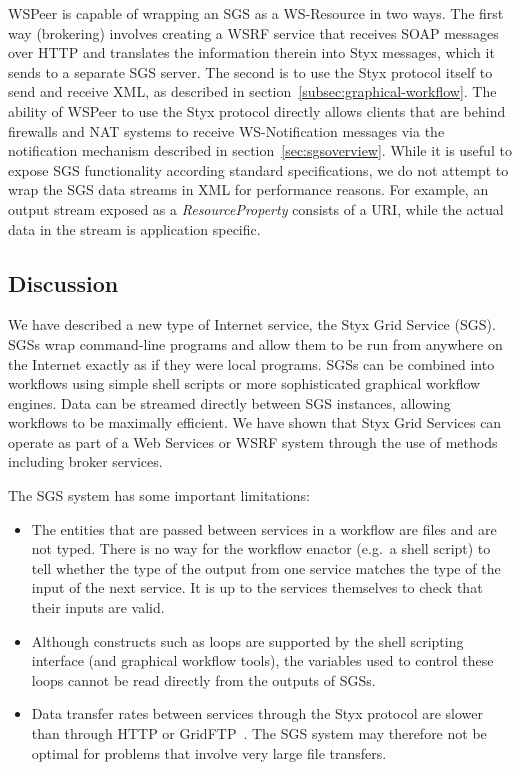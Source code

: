 \documentclass[a4paper]{article}
\begin{document}
WSPeer is capable of wrapping an SGS as a WS-Resource in two ways.  The first way (brokering) involves creating a WSRF service that receives SOAP messages over HTTP and translates the information therein into Styx messages, which it sends to a separate SGS server. The second is to use the Styx protocol itself to send and receive XML, as described in section~\ref{subsec:graphical-workflow}. The ability of WSPeer to use the Styx protocol directly allows clients that are behind firewalls and NAT systems to receive WS-Notification messages via the notification mechanism described in section~\ref{sec:sgsoverview}. While it is useful to expose SGS functionality according standard specifications, we do not attempt to wrap the SGS data streams in XML for performance reasons.  For example, an output stream exposed as a \textit{ResourceProperty\/} consists of a URI, while the actual data in the stream is application specific. 


\subsection{Discussion}

We have described a new type of Internet service, the Styx Grid Service (SGS).  SGSs wrap command-line programs and allow them to be run from anywhere on the Internet exactly as if they were local programs.  SGSs can be combined into workflows using simple shell scripts or more sophisticated graphical workflow engines.  Data can be streamed directly between SGS instances, allowing workflows to be maximally efficient.  We have shown that Styx Grid Services can operate as part of a Web Services or WSRF system through the use of methods including broker services.

The SGS system has some important limitations:

\begin{itemize}
	\item The entities that are passed between services in a workflow are files and are not typed.  There is no way for the workflow enactor (e.g.\ a shell script) to tell whether the type of the output from one service matches the type of the input of the next service.  It is up to the services themselves to check that their inputs are valid.
	\item Although constructs such as loops are supported by the shell scripting interface (and graphical workflow tools), the variables used to control these loops cannot be read directly from the outputs of SGSs.
	\item Data transfer rates between services through the Styx protocol are slower than through HTTP or GridFTP~\cite{blower:2005}.  The SGS system may therefore not be optimal for problems that involve very large file transfers.
\end{itemize}
\end{document}
